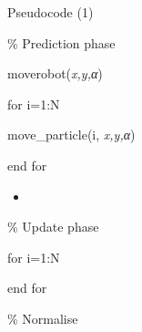 \documentclass[compress]{beamer}
\begin{document}
\begin{frame}{Pseudocode (1)}
\begin{block}{\% Prediction phase}
\end{block}

\begin{block}{moverobot(\emph{x,y,α})}

\end{block}

\begin{block}{for i=1:N}

\end{block}

\begin{block}{move\_particle(i, \emph{x,y,α})}

\end{block}

\begin{block}{end for}

\end{block}

\begin{block}{}

\begin{itemize}
\item ~
\end{itemize}

\end{block}

\begin{block}{\% Update phase}

\end{block}

\begin{block}{}

\end{block}

\begin{block}{for i=1:N}

\end{block}

\begin{block}{}

\end{block}

\begin{block}{}

\end{block}

\begin{block}{end for}

\end{block}

\begin{block}{\% Normalise}

\end{block}


\end{frame}
\end{document}
